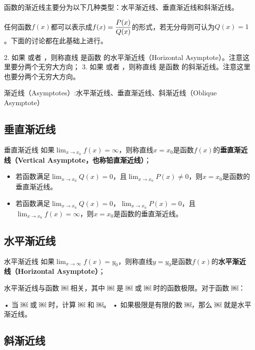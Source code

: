 
函数的渐近线主要分为以下几种类型：水平渐近线、垂直渐近线和斜渐近线。

任何函数$f(x)$都可以表示成$\displaystyle f(x)={P(x)\over Q(x)}$的形式，若无分母则可认为$Q(x)=1$。下面的讨论都在此基础上进行。

2.  如果 或者 ，则称直线 是函数 的水平渐近线（Horizontal Asymptote）。注意这里要分两个无穷大方向；
3.  如果 或者 ，则称直线 是函数 的斜渐近线。注意这里也要分两个无穷大方向。
\item 渐近线（Asymptotes）:水平渐近线、垂直渐近线、斜渐近线（Oblique Asymptote）
\subsection{垂直渐近线}

\begin{definition}{垂直渐近线}
如果$\displaystyle \lim_{x\to x_0}f(x)=\infty$，则称直线$x=x_0$是函数$f(x)$的\textbf{垂直渐近线（Vertical Asymptote，也称铅直渐近线）}；
\end{definition}

\begin{itemize}
\item 若函数满足$\displaystyle\lim_{x\to x_0}Q(x)=0$，且$\displaystyle\lim_{x\to x_0}P(x)\neq0$，则$x=x_0$是函数的垂直渐近线。
\item 若函数满足$\displaystyle\lim_{x\to x_0}Q(x)=0$，$\displaystyle\lim_{x\to x_0}P(x)=0$，且$\displaystyle \lim_{x\to x_0}f(x)=\infty$，则$x=x_0$是函数的垂直渐近线。
\end{itemize}

\subsection{水平渐近线}

\begin{definition}{水平渐近线}
如果$\displaystyle \lim_{x\to \infty}f(x)=y_0$，则称直线$y=y_0$是函数$f(x)$的\textbf{水平渐近线（Horizontal Asymptote）}；
\end{definition}

水平渐近线与函数 ￼ 相关，其中 ￼ 是 ￼ 或 ￼ 时的函数极限。对于函数 ￼：

	•	当 ￼ 或 ￼ 时，计算 ￼ 和 ￼。
	•	如果极限是有限的数 ￼，那么 ￼ 就是水平渐近线。

\subsection{斜渐近线}

